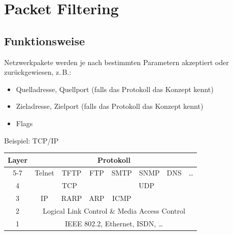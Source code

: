 \section{Packet Filtering}%
\label{sec:packet_filtering}

\subsection{Funktionsweise}%
\label{sub:funktionsweise}

Netzwerkpakete werden je nach bestimmten Parametern akzeptiert oder zurückgewiesen,
z.\,B.:
\begin{itemize}
  \item Quelladresse, Quellport (falls das Protokoll das Konzept kennt)
  \item Zieladresse, Zielport (falls das Protokoll das Konzept kennt)
  \item Flags
\end{itemize}

Beispiel: TCP/IP
\begin{center}
  \begin{tabular}{cccccccc}
    \toprule
    \textbf{Layer} & \multicolumn{7}{c}{\textbf{Protokoll}}\\
    \midrule
    5-7 & Telnet & TFTP & FTP & SMTP & SNMP & DNS & \dots\\
    \midrule
    4 & \multicolumn{3}{c}{TCP} & \multicolumn{3}{c}{UDP}\\
    \midrule
    3 & IP & RARP & ARP & ICMP\\
    \midrule
    2 & \multicolumn{7}{c}{Logical Link Control \& Media Access Control}\\
    \midrule
    1 & \multicolumn{7}{c}{IEEE 802.2, Ethernet, ISDN, \dots}\\
    \bottomrule
  \end{tabular}
\end{center}

